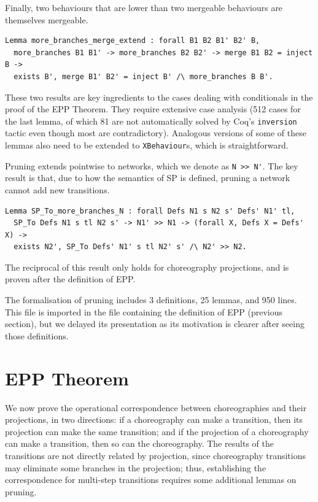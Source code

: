 \documentclass[runningheads]{llncs}
\begin{document}
Finally, two behaviours that are lower than two mergeable behaviours are themselves mergeable.
\begin{lstlisting}
Lemma more_branches_merge_extend : forall B1 B2 B1' B2' B,
  more_branches B1 B1' -> more_branches B2 B2' -> merge B1 B2 = inject B ->
  exists B', merge B1' B2' = inject B' /\ more_branches B B'.
\end{lstlisting}

These two results are key ingredients to the cases dealing with conditionals in the proof of the EPP
Theorem.
They require extensive case analysis (512 cases for the last lemma, of which 81 are not
automatically solved by Coq's \lstinline+inversion+ tactic even though most are contradictory).
Analogous versions of some of these lemmas also need to be extended to \lstinline+XBehaviour+s,
which is straightforward.

Pruning extends pointwise to networks, which we denote as \lstinline+N >> N'+.
The key result is that, due to how the semantics of SP is defined, pruning a network cannot add new
transitions.
\begin{lstlisting}
Lemma SP_To_more_branches_N : forall Defs N1 s N2 s' Defs' N1' tl,
  SP_To Defs N1 s tl N2 s' -> N1' >> N1 -> (forall X, Defs X = Defs' X) ->
  exists N2', SP_To Defs' N1' s tl N2' s' /\ N2' >> N2.
\end{lstlisting}
The reciprocal of this result only holds for choreography projections, and is proven after the
definition of EPP.

The formalisation of pruning includes 3 definitions, 25 lemmas, and 950 lines.
This file is imported in the file containing the definition of EPP (previous section), but we
delayed its presentation as its motivation is clearer after seeing those definitions.



\section{EPP Theorem}
\label{sec:epp-theorem}

We now prove the operational correspondence between choreographies and their projections, in two directions: if a choreography can make a transition, then its projection can make the same transition; and if the
projection of a choreography can make a transition, then so can the choreography.
The results of the transitions are not directly related by projection, since choreography transitions
may eliminate some branches in the projection; thus, establishing the correspondence for multi-step transitions
requires some additional lemmas on pruning.
\end{document}
